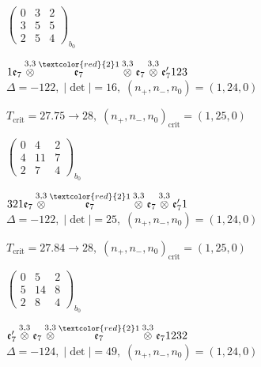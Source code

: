 \documentclass[10pt]{article}
\begin{document}
\hspace{2em}$\left(\begin{smallmatrix}0 & 3 & 2 \\ 3 & 5 & 5 \\ 2 & 5 & 4\end{smallmatrix}\right)_{\!b_0}$

\smallskip

$1\mathfrak{e}_7\overset{3,3}{\otimes}\overset{\textcolor{red}{2}1}{\mathfrak{e}_7}\overset{3,3}{\otimes}\mathfrak{e}_7\overset{3,3}{\otimes}\mathfrak{e}_7'123$ \quad $\Delta=-122,\; |\det|=16,\; (n_+,n_-,n_0)=(1,24,0)$

\hspace{1em}$T_{\text{crit}}=27.75 \to 28,\; (n_+,n_-,n_0)_{\text{crit}}=(1,25,0)$

\hspace{2em}$\left(\begin{smallmatrix}0 & 4 & 2 \\ 4 & 11 & 7 \\ 2 & 7 & 4\end{smallmatrix}\right)_{\!b_0}$

\smallskip

$321\mathfrak{e}_7\overset{3,3}{\otimes}\overset{\textcolor{red}{2}1}{\mathfrak{e}_7}\overset{3,3}{\otimes}\mathfrak{e}_7\overset{3,3}{\otimes}\mathfrak{e}_7'1$ \quad $\Delta=-122,\; |\det|=25,\; (n_+,n_-,n_0)=(1,24,0)$

\hspace{1em}$T_{\text{crit}}=27.84 \to 28,\; (n_+,n_-,n_0)_{\text{crit}}=(1,25,0)$

\hspace{2em}$\left(\begin{smallmatrix}0 & 5 & 2 \\ 5 & 14 & 8 \\ 2 & 8 & 4\end{smallmatrix}\right)_{\!b_0}$

\smallskip

$\mathfrak{e}_7'\overset{3,3}{\otimes}\mathfrak{e}_7\overset{3,3}{\otimes}\overset{\textcolor{red}{2}1}{\mathfrak{e}_7}\overset{3,3}{\otimes}\mathfrak{e}_71232$ \quad $\Delta=-124,\; |\det|=49,\; (n_+,n_-,n_0)=(1,24,0)$
\end{document}
